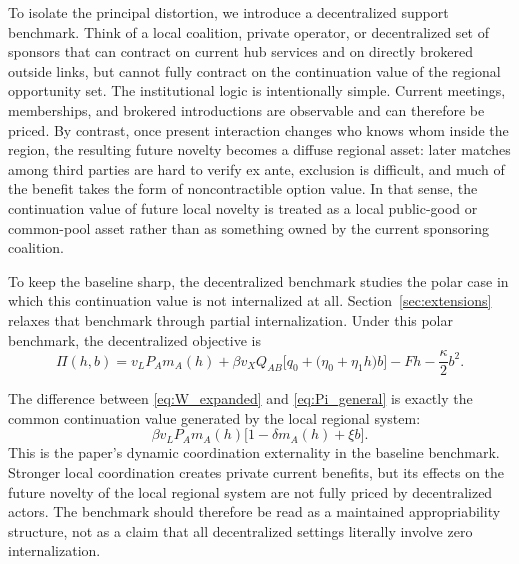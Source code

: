 To isolate the principal distortion, we introduce a decentralized support benchmark. Think of a local coalition, private operator, or decentralized set of sponsors that can contract on current hub services and on directly brokered outside links, but cannot fully contract on the continuation value of the regional opportunity set. The institutional logic is intentionally simple. Current meetings, memberships, and brokered introductions are observable and can therefore be priced. By contrast, once present interaction changes who knows whom inside the region, the resulting future novelty becomes a diffuse regional asset: later matches among third parties are hard to verify ex ante, exclusion is difficult, and much of the benefit takes the form of noncontractible option value. In that sense, the continuation value of future local novelty is treated as a local public-good or common-pool asset rather than as something owned by the current sponsoring coalition.

To keep the baseline sharp, the decentralized benchmark studies the polar case in which this continuation value is not internalized at all. Section~\ref{sec:extensions} relaxes that benchmark through partial internalization. Under this polar benchmark, the decentralized objective is
\begin{equation}
\Pi(h,b)
=
v_L P_A m_A(h)
+
\beta v_X Q_{AB}\bigl[q_0+\bigl(\eta_0+\eta_1 h\bigr)b\bigr]
-Fh-\frac{\kappa}{2}b^2.
\label{eq:Pi_general}
\end{equation}

The difference between \eqref{eq:W_expanded} and \eqref{eq:Pi_general} is exactly the common continuation value generated by the local regional system:
\[
\beta v_L P_A m_A(h)\bigl[1-\delta m_A(h)+\xi b\bigr].
\]
This is the paper's dynamic coordination externality in the baseline benchmark. Stronger local coordination creates private current benefits, but its effects on the future novelty of the local regional system are not fully priced by decentralized actors. The benchmark should therefore be read as a maintained appropriability structure, not as a claim that all decentralized settings literally involve zero internalization.

